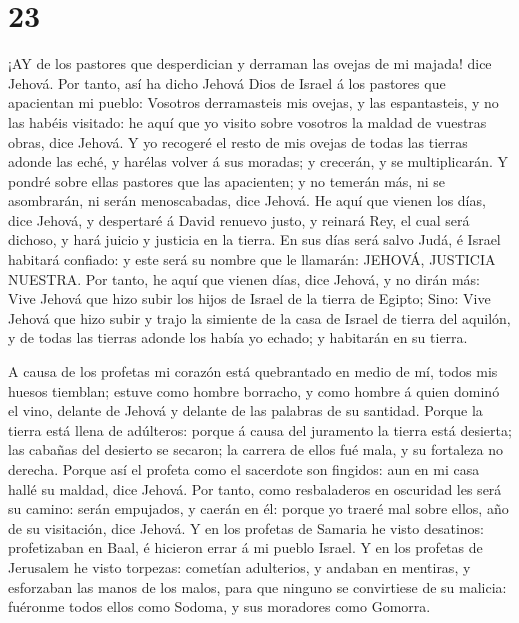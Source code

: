 \hypertarget{section-22}{%
\section{23}\label{section-22}}

 ¡AY de los pastores que desperdician y derraman las ovejas
de mi majada! dice Jehová.  Por tanto, así ha dicho Jehová
Dios de Israel á los pastores que apacientan mi pueblo: Vosotros
derramasteis mis ovejas, y las espantasteis, y no las habéis visitado:
he aquí que yo visito sobre vosotros la maldad de vuestras obras, dice
Jehová.  Y yo recogeré el resto de mis ovejas de todas las
tierras adonde las eché, y harélas volver á sus moradas; y crecerán, y
se multiplicarán.  Y pondré sobre ellas pastores que las
apacienten; y no temerán más, ni se asombrarán, ni serán menoscabadas,
dice Jehová.  He aquí que vienen los días, dice Jehová, y
despertaré á David renuevo justo, y reinará Rey, el cual será dichoso, y
hará juicio y justicia en la tierra.  En sus días será salvo
Judá, é Israel habitará confiado: y este será su nombre que le llamarán:
JEHOVÁ, JUSTICIA NUESTRA.  Por tanto, he aquí que vienen
días, dice Jehová, y no dirán más: Vive Jehová que hizo subir los hijos
de Israel de la tierra de Egipto;  Sino: Vive Jehová que
hizo subir y trajo la simiente de la casa de Israel de tierra del
aquilón, y de todas las tierras adonde los había yo echado; y habitarán
en su tierra.

 A causa de los profetas mi corazón está quebrantado en
medio de mí, todos mis huesos tiemblan; estuve como hombre borracho, y
como hombre á quien dominó el vino, delante de Jehová y delante de las
palabras de su santidad.  Porque la tierra está llena de
adúlteros: porque á causa del juramento la tierra está desierta; las
cabañas del desierto se secaron; la carrera de ellos fué mala, y su
fortaleza no derecha.  Porque así el profeta como el
sacerdote son fingidos: aun en mi casa hallé su maldad, dice Jehová.
 Por tanto, como resbaladeros en oscuridad les será su
camino: serán empujados, y caerán en él: porque yo traeré mal sobre
ellos, año de su visitación, dice Jehová.  Y en los
profetas de Samaria he visto desatinos: profetizaban en Baal, é hicieron
errar á mi pueblo Israel.  Y en los profetas de Jerusalem
he visto torpezas: cometían adulterios, y andaban en mentiras, y
esforzaban las manos de los malos, para que ninguno se convirtiese de su
malicia: fuéronme todos ellos como Sodoma, y sus moradores como Gomorra.

